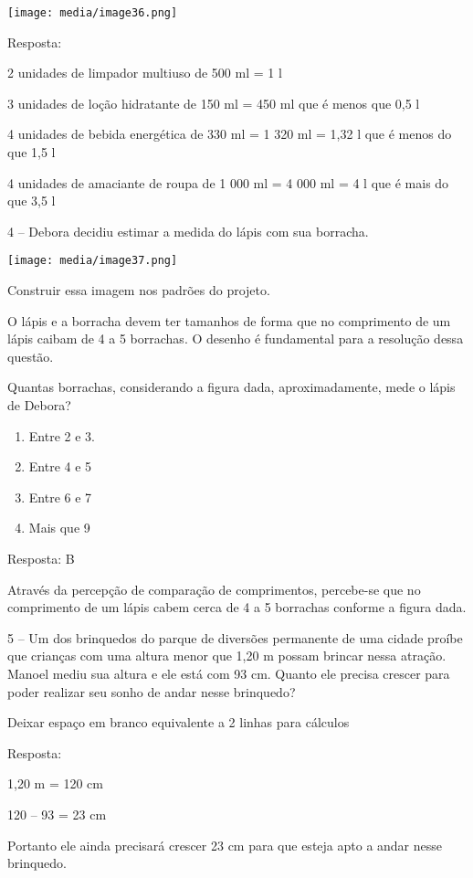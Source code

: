 \texttt{[image: media/image36.png]}

Resposta:

2 unidades de limpador multiuso de 500 ml = 1 l

3 unidades de loção hidratante de 150 ml = 450 ml que é menos que 0,5 l

4 unidades de bebida energética de 330 ml = 1 320 ml = 1,32 l que é
menos do que 1,5 l

4 unidades de amaciante de roupa de 1 000 ml = 4 000 ml = 4 l que é mais
do que 3,5 l

4 -- Debora decidiu estimar a medida do lápis com sua borracha.

\texttt{[image: media/image37.png]}

Construir essa imagem nos padrões do projeto.

O lápis e a borracha devem ter tamanhos de forma que no comprimento de
um lápis caibam de 4 a 5 borrachas. O desenho é fundamental para a
resolução dessa questão.

Quantas borrachas, considerando a figura dada, aproximadamente, mede o
lápis de Debora?

\begin{enumerate}
\def\labelenumi{\alph{enumi})}
\item
  Entre 2 e 3.
\item
  Entre 4 e 5
\item
  Entre 6 e 7
\item
  Mais que 9
\end{enumerate}

Resposta: B

Através da percepção de comparação de comprimentos, percebe-se que no
comprimento de um lápis cabem cerca de 4 a 5 borrachas conforme a figura
dada.

5 -- Um dos brinquedos do parque de diversões permanente de uma cidade
proíbe que crianças com uma altura menor que 1,20 m possam brincar nessa
atração. Manoel mediu sua altura e ele está com 93 cm. Quanto ele
precisa crescer para poder realizar seu sonho de andar nesse brinquedo?

Deixar espaço em branco equivalente a 2 linhas para cálculos

Resposta:

1,20 m = 120 cm

120 -- 93 = 23 cm

Portanto ele ainda precisará crescer 23 cm para que esteja apto a andar
nesse brinquedo.

